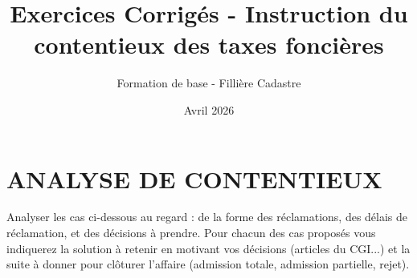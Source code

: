 \documentclass[answers, 12pt]{exam}
\title{Exercices Corrigés - Instruction du contentieux des taxes foncières}
\author{Formation de base - Fillière Cadastre}
\date{Avril 2026}
\begin{document}
	
	\maketitle
	
	\newpage
	
	\section*{ANALYSE DE CONTENTIEUX}
	
	Analyser les cas ci-dessous au regard : de la forme des réclamations, des délais de réclamation, et des décisions à prendre. Pour chacun des cas proposés vous indiquerez la solution à retenir en motivant vos décisions (articles du CGI...) et la suite à donner pour clôturer l'affaire (admission totale, admission partielle, rejet).
	
\end{document}
